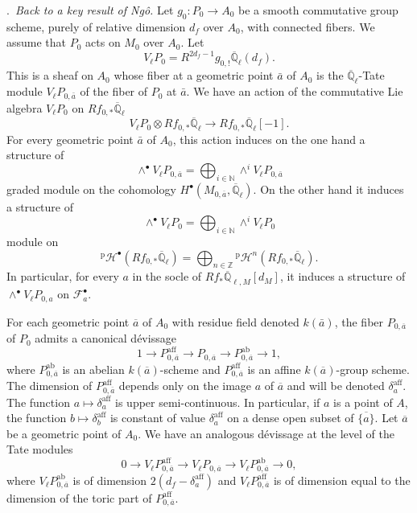 \documentclass[12pt,a4paper,oneside,english,leqno]{smfart}
\makeatletter
\numberwithin{equation}{subsection}
\numberwithin{theo}{subsection}
\newenvironment{paragr}[1][]{\medskip\refstepcounter{subsection}%
  \par\noindent\hspace*{\parindent}\thesubsection.\ \emph{#1}%
  \@ifundefined{@empty}{}{}\ignorespaces}{\medskip}
\theoremstyle{plain}
\theoremstyle{definition}
\theoremstyle{remark}
\newcommand{\ZZ}{\mathbb{Z}}
\newcommand{\NN}{\mathbb{N}}
\newcommand{\QQ}{\mathbb{Q}}
\newcommand{\Qlb}{\overline{\mathbb{Q}}_{\ell}}
\newcommand{\fc}{\mathcal{F}}
\newcommand{\hc}{\mathcal{H}}
\makeatother
\begin{document}
\begin{paragr}[Back to a key result of Ngô.]\label{S:10.3}
Let $g_0 : P_0\to A_0$ be a smooth commutative group scheme, purely of relative dimension $d_f$ over $A_0$, with connected fibers. We assume that $P_0$ acts on $M_0$ over $A_0$. Let
$$V_\ell P_0 = R^{2d_f-1}g_{0,!}\Qlb(d_f).$$
This is a sheaf on $A_0$ whose fiber at a geometric point $\bar{a}$ of $A_0$ is the $\Qlb$-Tate module $V_\ell P_{0,\bar{a}}$ of the fiber of $P_0$ at $\bar{a}$. We have an action of the commutative Lie algebra $V_\ell P_0$ on $Rf_{0,*}\Qlb$
$$V_\ell P_0\otimes Rf_{0,*}\Qlb\to Rf_{0,*}\Qlb[-1].$$
For every geometric point $\bar{a}$ of $A_0$, this action induces on the one hand a structure of
$$\wedge^\bullet V_\ell P_{0,\bar{a}} = \bigoplus_{i\in\NN}\wedge^i V_\ell P_{0,\bar{a}}$$
graded module on the cohomology $H^\bullet(M_{0,\overline{a}},\Qlb)$. On the other hand it induces a structure of
$$\wedge^\bullet V_\ell P_0 = \bigoplus_{i\in\NN}\wedge^i V_\ell P_0$$
module on
$${}^{\mathrm{p}}\hc^\bullet(Rf_{0,*}\Qlb) = \bigoplus_{n\in\ZZ}{}^{\mathrm{p}}\hc^n(Rf_{0,*}\Qlb).$$
In particular, for every $a$ in the socle of $Rf_*\overline{\QQ}_{\ell,M}[d_M]$, it induces a structure of $\wedge^\bullet V_\ell P_{0,a}$ on $\fc_a^\bullet$.

For each geometric point $\overline{a}$ of $A_0$ with residue field denoted $k(\bar{a})$, the fiber $P_{0,\overline{a}}$ of $P_0$ admits a canonical dévissage
\begin{equation}\label{eq:10.3.1}
1\to P_{0,\overline{a}}^{\mathrm{aff}}\to P_{0,\overline{a}}\to P_{0,\overline{a}}^{\mathrm{ab}}\to 1,
\end{equation}
where $P_{0,\overline{a}}^{\mathrm{ab}}$ is an abelian $k(\overline{a})$-scheme and $P_{0,\overline{a}}^{\mathrm{aff}}$ is an affine $k(\overline{a})$-group scheme. The dimension of $P_{0,\overline{a}}^{\mathrm{aff}}$ depends only on the image $a$ of $\overline{a}$ and will be denoted $\delta_a^{\mathrm{aff}}$. The function $a\mapsto\delta_a^{\mathrm{aff}}$ is upper semi-continuous. In particular, if $a$ is a point of $A$, the function $b\mapsto\delta_b^{\mathrm{aff}}$ is constant of value $\delta_a^{\mathrm{aff}}$ on a dense open subset of $\overline{\{a\}}$. Let $\overline{a}$ be a geometric point of $A_0$. We have an analogous dévissage at the level of the Tate modules
\begin{equation}\label{eq:10.3.2}
0\to V_\ell P_{0,\overline{a}}^{\mathrm{aff}}\to V_\ell P_{0,\overline{a}}\to V_\ell P_{0,\overline{a}}^{\mathrm{ab}}\to 0,
\end{equation}
where $V_\ell P_{0,\overline{a}}^{\mathrm{ab}}$ is of dimension $2(d_f-\delta_a^{\mathrm{aff}})$ and $V_\ell P_{0,\overline{a}}^{\mathrm{aff}}$ is of dimension equal to the dimension of the toric part of $P_{0,\overline{a}}^{\mathrm{aff}}$.


\end{paragr}
\end{document}
